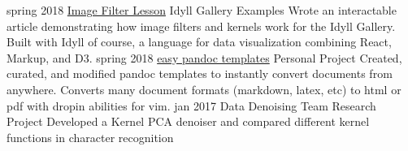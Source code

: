 \documentclass[]{friggeri-cv}
\begin{document}
\begin{entrylist}
  \entry
    {spring 2018}
    {\href{https://idyll-lang.org/gallery/stepping-into-the-filter}{Image Filter Lesson}}
    {Idyll Gallery Examples}
    {Wrote an interactable article demonstrating how image filters and kernels work for the Idyll Gallery. Built with Idyll of course, a language for data visualization combining React, Markup, and D3.}
  \entry
    {spring 2018}
    {\href{https://github.com/ryangrose/easy-pandoc-templates}{easy pandoc templates}}
    {Personal Project}
    {Created, curated, and modified pandoc templates to instantly convert documents from anywhere. Converts many document formats (markdown, latex, etc) to html or pdf with dropin abilities for vim.}
   \entry
    {jan 2017}
    {Data Denoising}
    {Team Research Project}
    {Developed a Kernel PCA denoiser and compared different kernel functions in character recognition}
\end{entrylist}






\end{document}
